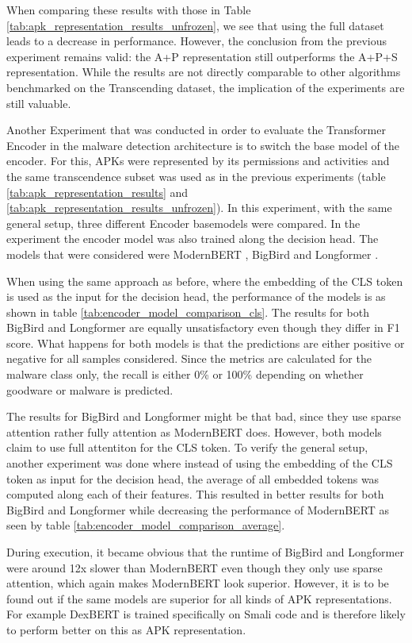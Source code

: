 When comparing these results with those in Table \ref{tab:apk_representation_results_unfrozen}, 
we see that using the full dataset leads to a decrease in performance. 
However, the conclusion from the previous experiment remains valid: 
the A+P representation still outperforms the A+P+S representation.
While the results are not directly comparable to other algorithms benchmarked on the 
Transcending dataset, the implication of the experiments are still valuable.

Another Experiment that was conducted in order to evaluate the 
Transformer Encoder in the malware detection architecture is to switch
the base model of the encoder.
For this, APKs were represented by its permissions and activities
and the same transcendence subset was used as in the previous experiments 
(table \ref{tab:apk_representation_results} and \ref{tab:apk_representation_results_unfrozen}).
In this experiment, with the same general setup, three different Encoder basemodels were compared.
In the experiment the encoder model was also trained along the decision head.
The models that were considered were ModernBERT \cite{modernbert}, 
BigBird \cite{bigbird} and Longformer \cite{longformer}. 

When using the same approach as before, where the embedding of the CLS token is used
as the input for the decision head, the performance of the models is as shown in 
table \ref{tab:encoder_model_comparison_cls}. The results for both BigBird and 
Longformer are equally unsatisfactory even though they differ in F1 score.
What happens for both models is that the predictions are either positive or negative for all samples considered. 
Since the metrics are calculated for the malware class only, the recall is either 0\%
or 100\% depending on whether goodware or malware is predicted.

The results for BigBird and Longformer might be that bad, since they use sparse attention
rather fully attention as ModernBERT does.
However, both models claim to use full attentiton for the CLS token.
To verify the general setup, another experiment was done where instead of 
using the embedding of the CLS token
as input for the decision head, the average of all embedded 
tokens was computed along each of their features.
This resulted in better results for both BigBird and Longformer 
while decreasing the performance of
ModernBERT as seen by table \ref{tab:encoder_model_comparison_average}.

During execution, it became obvious that the runtime of BigBird and Longformer were
around 12x slower than ModernBERT even though they only use sparse attention, 
which again makes ModernBERT look superior.
However, it is to be found out if the same models are superior for all kinds of
APK representations. For example DexBERT is trained specifically on Smali code
and is therefore likely to perform better on this as APK representation.

